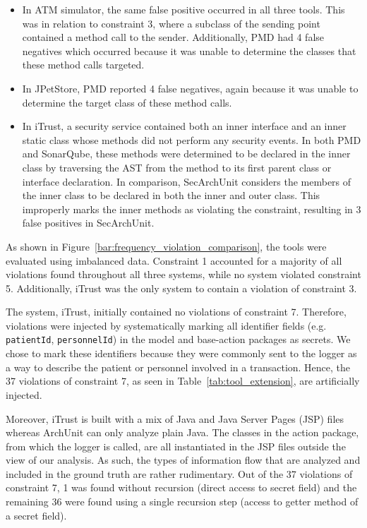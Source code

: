 \begin{itemize}
    \item In ATM simulator, the same false positive occurred in all three tools. This was in relation to constraint 3, where a subclass of the sending point contained a method call to the sender. Additionally, PMD had 4 false negatives which occurred because it was unable to determine the classes that these method calls targeted.
    \item In JPetStore, PMD reported 4 false negatives, again because it was unable to determine the target class of these method calls.
    \item In iTrust, a security service contained both an inner interface and an inner static class whose methods did not perform any security events. In both PMD and SonarQube, these methods were determined to be declared in the inner class by traversing the AST from the method to its first parent class or interface declaration. In comparison, SecArchUnit considers the members of the inner class to be declared in both the inner and outer class. This improperly marks the inner methods as violating the constraint, resulting in 3 false positives in SecArchUnit.
\end{itemize}

As shown in Figure~\ref{bar:frequency_violation_comparison}, the tools were evaluated using imbalanced data. Constraint 1 accounted for a majority of all violations found throughout all three systems, while no system violated constraint 5. Additionally, iTrust was the only system to contain a violation of constraint 3. 

The system, iTrust, initially contained no violations of constraint 7. Therefore, violations were injected by systematically marking all identifier fields (e.g. \texttt{patientId}, \texttt{personnelId}) in the model and base-action packages as secrets. We chose to mark these identifiers because they were commonly sent to the logger as a way to describe the patient or personnel involved in a transaction. Hence, the 37 violations of constraint 7, as seen in Table~\ref{tab:tool_extension}, are artificially injected.

Moreover, iTrust is built with a mix of Java and Java Server Pages (JSP) files whereas ArchUnit can only analyze plain Java. The classes in the action package, from which the logger is called, are all instantiated in the JSP files outside the view of our analysis. As such, the types of information flow that are analyzed and included in the ground truth are rather rudimentary. Out of the 37 violations of constraint 7, 1 was found without recursion (direct access to secret field) and the remaining 36 were found using a single recursion step (access to getter method of a secret field).

